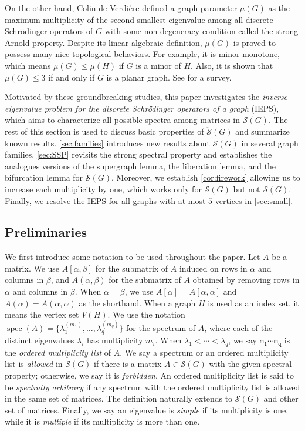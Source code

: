 \documentclass{article}
\theoremstyle{definition}
\newcommand{\spec}{\operatorname{spec}}
\newcommand{\mptn}{\mathcal{S}}
\newcommand{\mdso}{\ddot{\mathcal{S}}}
\begin{document}
On the other hand, Colin de Verdière \cite{CdV, CdVF} defined a graph parameter $\mu(G)$ as the maximum multiplicity of the second smallest eigenvalue among all discrete Schrödinger operators of $G$ with some non-degeneracy condition called the strong Arnold property.  Despite its linear algebraic definition, $\mu(G)$ is proved to possess many nice topological behaviors.  For example, it is minor monotone, which means $\mu(G) \leq \mu(H)$ if $G$ is a minor of $H$.  Also, it is shown that $\mu(G) \leq 3$ if and only if $G$ is a planar graph.  See \cite{HLS99} for a survey.

Motivated by these groundbreaking studies, this paper investigates the \emph{inverse eigenvalue problem for the discrete Schrödinger operators of a graph} (IEPS), which aims to characterize all possible spectra among matrices in $\mdso(G)$.  The rest of this section is used to discuss basic properties of $\mdso(G)$ and summarize known results.  \cref{sec:families} introduces new results about $\mdso(G)$ in several graph families.  \cref{sec:SSP} revisits the strong spectral property and establishes the analogues versions of the supergraph lemma, the liberation lemma, and the bifurcation lemma for $\mdso(G)$.  Moreover, we establish \cref{cor:firework} allowing us to increase each multiplicity by one, which works only for $\mdso(G)$ but not $\mptn(G)$.  Finally, we resolve the IEPS for all graphs with at most $5$ vertices in \cref{sec:small}.  

\subsection{Preliminaries}

We first introduce some notation to be used throughout the paper.  Let $A$ be a matrix.  We use $A[\alpha,\beta]$ for the submatrix of $A$ induced on rows in $\alpha$ and columns in $\beta$, and $A(\alpha,\beta)$ for the submatrix of $A$ obtained by removing rows in $\alpha$ and columns in $\beta$.  When $\alpha = \beta$, we use $A[\alpha] = A[\alpha,\alpha]$ and $A(\alpha) = A(\alpha,\alpha)$ as the shorthand.  When a graph $H$ is used as an index set, it means the vertex set $V(H)$.  We use the notation $\spec(A) = \{\lambda_1^{(m_1)}, \ldots, \lambda_q^{(m_q)}\}$ for the spectrum of $A$, where each of the distinct eigenvalues $\lambda_i$ has multiplicity $m_i$.  When $\lambda_1 < \cdots < \lambda_q$, we say $\mathtt{m_1\cdots m_q}$ is the \emph{ordered multiplicity list} of $A$.  We say a spectrum or an ordered multiplicity list is \emph{allowed} in $\mptn(G)$ if there is a matrix $A\in\mptn(G)$ with the given spectral property; otherwise, we say it is \emph{forbidden}.  An ordered multiplicity list is said to be \emph{spectrally arbitrary} if any spectrum with the ordered multiplicity list is allowed in the same set of matrices.  The definition naturally extends to $\mdso(G)$ and other set of matrices.  Finally, we say an eigenvalue is \emph{simple} if its multiplicity is one, while it is \emph{multiple} if its multiplicity is more than one.
\end{document}
